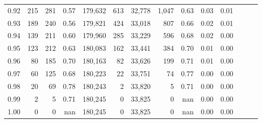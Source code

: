 \begin{tabular}{rrrrrrrrrrrrrr}
0.92 &    215 &  281 &  0.57 &  179,632 &      613 &  32,778 &   1,047 &  0.63 &  0.03 &      0.01 \\
0.93 &    189 &  240 &  0.56 &  179,821 &      424 &  33,018 &     807 &  0.66 &  0.02 &      0.01 \\
0.94 &    139 &  211 &  0.60 &  179,960 &      285 &  33,229 &     596 &  0.68 &  0.02 &      0.00 \\
0.95 &    123 &  212 &  0.63 &  180,083 &      162 &  33,441 &     384 &  0.70 &  0.01 &      0.00 \\
0.96 &     80 &  185 &  0.70 &  180,163 &       82 &  33,626 &     199 &  0.71 &  0.01 &      0.00 \\
0.97 &     60 &  125 &  0.68 &  180,223 &       22 &  33,751 &      74 &  0.77 &  0.00 &      0.00 \\
0.98 &     20 &   69 &  0.78 &  180,243 &        2 &  33,820 &       5 &  0.71 &  0.00 &      0.00 \\
0.99 &      2 &    5 &  0.71 &  180,245 &        0 &  33,825 &       0 &   nan &  0.00 &      0.00 \\
1.00 &      0 &    0 &   nan &  180,245 &        0 &  33,825 &       0 &   nan &  0.00 &      0.00 \\
\bottomrule
\end{tabular}
